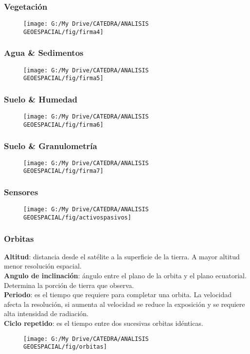 \documentclass[14pt]{beamer}
\begin{document}
\begin{frame}
\frametitle{Vegetación}
  \begin{figure}
    \centering
    \texttt{[image: G:/My Drive/CATEDRA/ANALISIS GEOESPACIAL/fig/firma4]}
  \end{figure}
\end{frame}
\begin{frame}
\frametitle{Agua \& Sedimentos}
  \begin{figure}
    \centering
    \texttt{[image: G:/My Drive/CATEDRA/ANALISIS GEOESPACIAL/fig/firma5]}
  \end{figure}
\end{frame}
\begin{frame}
\frametitle{Suelo \& Humedad}
  \begin{figure}
    \centering
    \texttt{[image: G:/My Drive/CATEDRA/ANALISIS GEOESPACIAL/fig/firma6]}
  \end{figure}
\end{frame}
\begin{frame}
\frametitle{Suelo \& Granulometría}
  \begin{figure}
    \centering
    \texttt{[image: G:/My Drive/CATEDRA/ANALISIS GEOESPACIAL/fig/firma7]}
  \end{figure}
\end{frame}
\begin{frame}
\frametitle{Sensores}
  \begin{figure}
    \centering
    \texttt{[image: G:/My Drive/CATEDRA/ANALISIS GEOESPACIAL/fig/activospasivos]}
  \end{figure}
\end{frame}
 \begin{frame}
\frametitle{Orbitas}
\scriptsize{
\textbf{Altitud}: distancia desde el satélite a la superficie de la tierra. A mayor altitud menor resolución espacial.\\
\textbf{Angulo de inclinación}:  ángulo entre el plano de la orbita y el plano ecuatorial. Determina la porción de tierra que observa.\\
\textbf{Periodo}: es el tiempo que requiere para completar una orbita. La velocidad afecta la resolución, si aumenta al velocidad se reduce la exposición y se requiere alta intensidad de radiación.\\
\textbf{Ciclo repetido}: es el tiempo entre dos sucesivas orbitas idénticas.
}
 \begin{figure}
    \centering
    \texttt{[image: G:/My Drive/CATEDRA/ANALISIS GEOESPACIAL/fig/orbitas]}
  \end{figure}
\end{frame}
\end{document}
